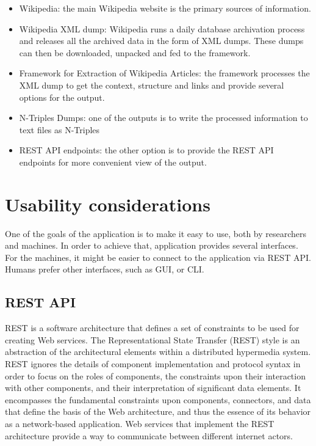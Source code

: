 \documentclass[thesis=M,english,hidelinks]{FITthesis}[2019/12/23]
\begin{document}
\begin{itemize}
	\item Wikipedia: the main Wikipedia website is the primary sources of information.
	\item Wikipedia XML dump: Wikipedia runs a daily database archivation process and releases all the archived data in the form of XML dumps. These dumps can then be downloaded, unpacked and fed to the framework.
	\item Framework for Extraction of Wikipedia Articles:  the framework processes the XML dump to get the context, structure and links and provide several options for the output.
	\item N-Triples Dumps: one of the outputs is to write the processed information to text files as N-Triples
	\item REST API endpoints: the other option is to provide the REST API endpoints for more convenient view of the output.
\end{itemize}


\section{Usability considerations}\label{usability_considerations}

One of the goals of the application is to make it easy to use, both by researchers and machines. In order to achieve that, application provides several interfaces. For the machines, it might be easier to connect to the application via \gls{REST} \gls{API}. Humans prefer other interfaces, such as \gls{GUI}, or \gls{CLI}.

\subsection{REST API}

\gls{REST} is a software architecture that defines a set of constraints to be used for creating Web services. The Representational State Transfer (REST) style is an abstraction of the architectural elements within a distributed hypermedia system. REST ignores the details of component implementation and protocol syntax in order to focus on the roles of components, the constraints upon their interaction with other components, and their interpretation of significant data elements. It encompasses the fundamental constraints upon components, connectors, and data that define the basis of the Web architecture, and thus the essence of its behavior as a network-based application\cite{rest_proposal}. Web services that implement the REST architecture provide a way to communicate between different internet actors.
\end{document}

